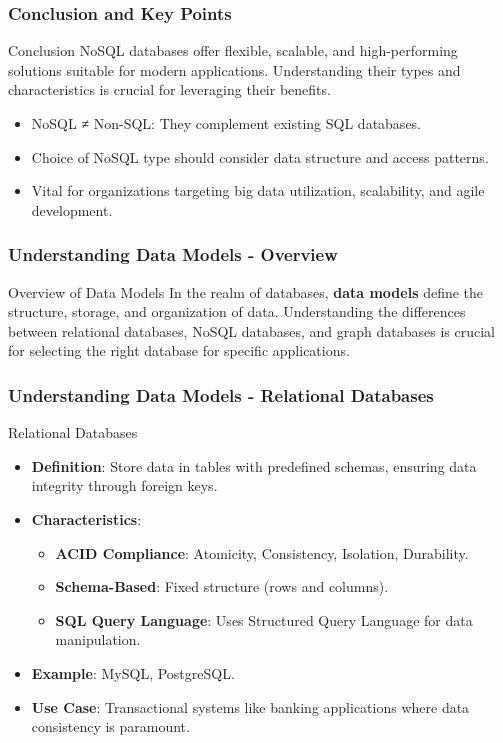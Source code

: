\documentclass[aspectratio=169]{beamer}
\begin{document}
\begin{frame}[fragile]
    \frametitle{Conclusion and Key Points}
    \begin{block}{Conclusion}
        NoSQL databases offer flexible, scalable, and high-performing solutions suitable for modern applications. Understanding their types and characteristics is crucial for leveraging their benefits.
    \end{block}
    \begin{itemize}
        \item NoSQL ≠ Non-SQL: They complement existing SQL databases.
        \item Choice of NoSQL type should consider data structure and access patterns.
        \item Vital for organizations targeting big data utilization, scalability, and agile development.
    \end{itemize}
\end{frame}

\begin{frame}[fragile]
    \frametitle{Understanding Data Models - Overview}
    \begin{block}{Overview of Data Models}
        In the realm of databases, \textbf{data models} define the structure, storage, and organization of data. 
        Understanding the differences between relational databases, NoSQL databases, and graph databases is crucial for selecting the right database for specific applications.
    \end{block}
\end{frame}

\begin{frame}[fragile]
    \frametitle{Understanding Data Models - Relational Databases}
    \begin{block}{Relational Databases}
        \begin{itemize}
            \item \textbf{Definition}: Store data in tables with predefined schemas, ensuring data integrity through foreign keys.
            \item \textbf{Characteristics}:
                \begin{itemize}
                    \item \textbf{ACID Compliance}: Atomicity, Consistency, Isolation, Durability.
                    \item \textbf{Schema-Based}: Fixed structure (rows and columns).
                    \item \textbf{SQL Query Language}: Uses Structured Query Language for data manipulation.
                \end{itemize}
            \item \textbf{Example}: MySQL, PostgreSQL.
            \item \textbf{Use Case}: Transactional systems like banking applications where data consistency is paramount.
        \end{itemize}
    \end{block}
\end{frame}
\end{document}
